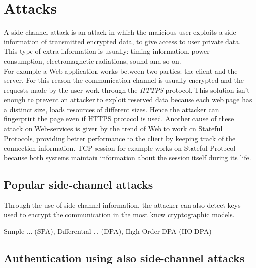 \chapter{Attacks}\label{chapter:SideCH}
A side-channel attack is an attack in which the malicious user exploits a side-information of transmitted encrypted data, to give access to user private data. This type of extra information is usually: timing information, power consumption, electromagnetic radiations, sound and so on.\\
For example a Web-application works between two parties: the client and the server. For this reason the communication channel is usually encrypted and the requests made by the user work through the \textit{HTTPS} protocol. This solution isn't enough to prevent an attacker to exploit reserved data because each web page has a distinct size, loads resources of different sizes. Hence the attacker can fingerprint the page even if HTTPS protocol is used. Another cause of these attack on Web-services is given by the trend of Web to work on Stateful Protocols, providing better performance to the client by keeping track of the connection information. TCP session for example works on Stateful Protocol because both systems maintain information about the session itself during its life\cite{side_leaks}.

\section{Popular side-channel attacks}
Through the use of side-channel information, the attacker can also detect keys used to encrypt the communication in the most know cryptographic models.
\begin{itemize}
{Simple ... (SPA), Differential ... (DPA), High Order DPA (HO-DPA)\cite{intro_DPA}
}
{}
{}
\end{itemize}
\begin{comment}
\descItem{Relay attack}
{
\begin{itemize}
	\descItem{MITM attack}
	{}
	\descItem{Replay attack}
	{}
\end{itemize}
}
\end{itemize}
\end{comment}


\section{Authentication using also side-channel attacks}